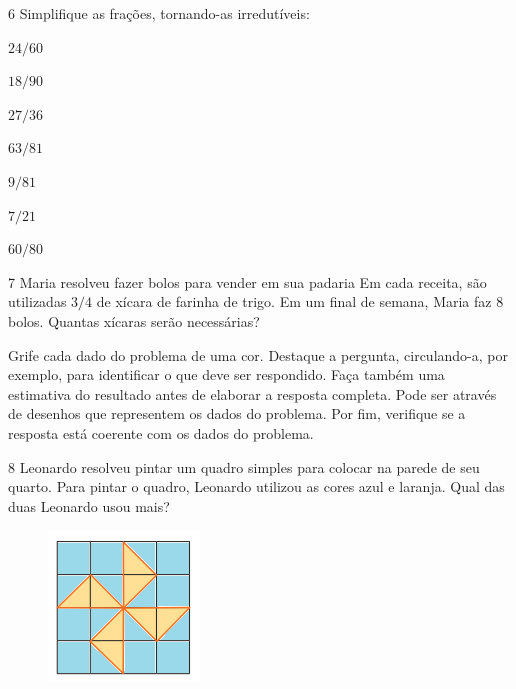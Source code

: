 {\num{6}  Simplifique as frações, tornando-as irredutíveis:

\begin{escolha}
\item $24/60$   
\item $18/90$   
\item $27/36$   
\item $63/81$   
\item $9/81$   
\item $7/21$   
\item $60/80$   
\end{escolha}

\num{7}  Maria resolveu fazer bolos para vender em sua padaria Em cada
receita, são utilizadas $3/4$ de xícara de farinha de trigo. Em um final
de semana, Maria faz $8$ bolos. Quantas xícaras serão necessárias?


\noindent Grife cada dado do problema de uma cor. Destaque a pergunta, circulando-a, por exemplo,
para identificar o que deve ser respondido. Faça também uma estimativa do resultado antes de elaborar a resposta completa. Pode ser através de desenhos que representem os dados do problema. Por fim, verifique se a resposta está coerente com os dados do problema.

\num{8}  Leonardo resolveu pintar um quadro simples para colocar na parede de
seu quarto. Para pintar o quadro, Leonardo utilizou as cores azul e laranja. Qual
das duas Leonardo usou mais?

\begin{figure}
\includegraphics[width=1.58333in,height=1.57292in]{./imgSAEB_6_MAT/media/image33.png}
\end{figure}


}
